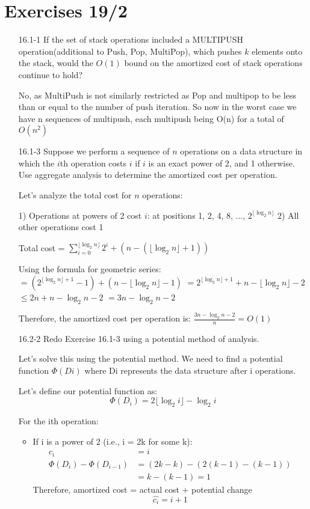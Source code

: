 \documentclass{article}
\theoremstyle{definition}
\begin{document}
\section{Exercises 19/2}

\begin{enumerate}
    \item[16.1-1] If the set of stack operations included a MULTIPUSH operation(additional to Push, Pop, MultiPop), which pushes $k$ elements onto the stack, would the $O(1)$ bound on the amortized cost of stack operations continue to hold?
    
    No, as MultiPush is not similarly restricted as Pop and multipop to be less than or equal to the number of push iteration. So now in the worst case we have n sequences of multipush, each multipush being O(n) for a total of $O(n^2)$

    \item[16.1-3] Suppose we perform a sequence of $n$ operations on a data structure in which the $i$th operation costs $i$ if $i$ is an exact power of 2, and 1 otherwise. Use aggregate analysis to determine the amortized cost per operation.
    
    Let's analyze the total cost for $n$ operations:

    1) Operations at powers of 2 cost $i$: at positions 1, 2, 4, 8, ..., $2^{\lfloor \log_2 n \rfloor}$
    2) All other operations cost 1

    Total cost = $\sum_{i=0}^{\lfloor \log_2 n \rfloor} 2^i + (n - (\lfloor \log_2 n \rfloor + 1))$

    Using the formula for geometric series:
    $= (2^{\lfloor \log_2 n \rfloor + 1} - 1) + (n - \lfloor \log_2 n \rfloor - 1)$
    $= 2^{\lfloor \log_2 n \rfloor + 1} + n - \lfloor \log_2 n \rfloor - 2$
    $\leq 2n + n - \log_2 n - 2$
    $= 3n - \log_2 n - 2$

    Therefore, the amortized cost per operation is:
    $\frac{3n - \log_2 n - 2}{n} = O(1)$

    \item[16.2-2] Redo Exercise 16.1-3 using a potential method of analysis.

    Let's solve this using the potential method. We need to find a potential function $\Phi(Di)$ where Di represents the data structure after i operations.

    Let's define our potential function as:
    \[ \Phi(D_i) = 2\lfloor \log_2 i \rfloor - \log_2 i \]

    For the ith operation:
    \begin{itemize}
        \item If i is a power of 2 (i.e., i = 2k for some k):
            \begin{align*}
                c_i &= i \\
                \Phi(D_i) - \Phi(D_{i-1}) &= (2k - k) - (2(k-1) - (k-1)) \\
                &= k - (k-1) = 1
            \end{align*}
            Therefore, amortized cost = actual cost + potential change
            \[ \hat{c_i} = i + 1 \]


\end{itemize}
\end{enumerate}
\end{document}
